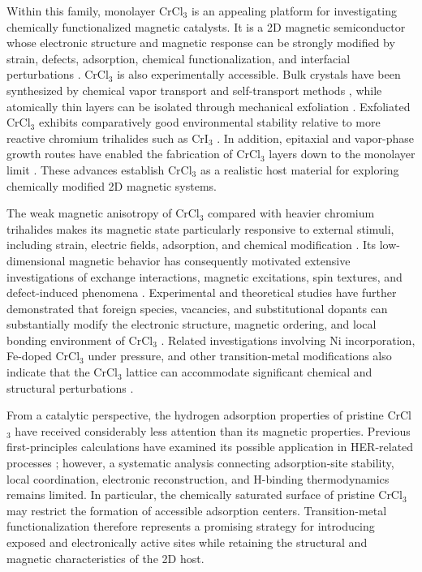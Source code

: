 \documentclass[journal=jacsat,manuscript=article]{achemso}
\begin{document}
Within this family, monolayer CrCl$_3$ is an appealing platform for investigating chemically functionalized magnetic catalysts. It is a 2D magnetic semiconductor whose electronic structure and magnetic response can be strongly modified by strain, defects, adsorption, chemical functionalization, and interfacial perturbations \cite{Xue2019,Webster2018,Dupont2021,Zhu2025}. CrCl$_3$ is also experimentally accessible. Bulk crystals have been synthesized by chemical vapor transport and self-transport methods \cite{Abdel-Hafiez2025,Mastrippolito2021}, while atomically thin layers can be isolated through mechanical exfoliation \cite{Kazim_2020}. Exfoliated CrCl$_3$ exhibits comparatively good environmental stability relative to more reactive chromium trihalides such as CrI$_3$ \cite{Mastrippolito2021}. In addition, epitaxial and vapor-phase growth routes have enabled the fabrication of CrCl$_3$ layers down to the monolayer limit \cite{Bedoya2021,Wang2022}. These advances establish CrCl$_3$ as a realistic host material for exploring chemically modified 2D magnetic systems.

The weak magnetic anisotropy of CrCl$_3$ compared with heavier chromium trihalides makes its magnetic state particularly responsive to external stimuli, including strain, electric fields, adsorption, and chemical modification \cite{Webster2018,Ebrahimian2023,Esteras2023}. Its low-dimensional magnetic behavior has consequently motivated extensive investigations of exchange interactions, magnetic excitations, spin textures, and defect-induced phenomena \cite{Sarkar2021,Stagraczynski2024,Esquembre-Kucukalic2025,Lu2020,Mastrippolito2021}. Experimental and theoretical studies have further demonstrated that foreign species, vacancies, and substitutional dopants can substantially modify the electronic structure, magnetic ordering, and local bonding environment of CrCl$_3$ \cite{Luo2020,Gao2018,Mastrippolito2021,Mastrippolito2022}. Related investigations involving Ni incorporation, Fe-doped CrCl$_3$ under pressure, and other transition-metal modifications also indicate that the CrCl$_3$ lattice can accommodate significant chemical and structural perturbations \cite{Wang2019,Abdel-Hafiez2025,Safi2023}.

From a catalytic perspective, the hydrogen adsorption properties of pristine CrCl$_3$ have received considerably less attention than its magnetic properties. Previous first-principles calculations have examined its possible application in HER-related processes \cite{Zala2024}; however, a systematic analysis connecting adsorption-site stability, local coordination, electronic reconstruction, and H-binding thermodynamics remains limited. In particular, the chemically saturated surface of pristine CrCl$_3$ may restrict the formation of accessible adsorption centers. Transition-metal functionalization therefore represents a promising strategy for introducing exposed and electronically active sites while retaining the structural and magnetic characteristics of the 2D host.
\end{document}
